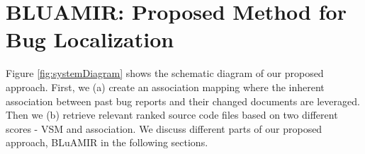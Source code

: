\documentclass[conference]{IEEEtran}
\begin{document}
\section{BLUAMIR: Proposed Method for Bug Localization} \label{sec:proposedmethod} 
Figure \ref{fig:systemDiagram} shows the schematic diagram of our proposed approach.
First, we (a) create an association mapping where the inherent association between past bug reports and their changed documents are leveraged.
Then we (b) retrieve relevant ranked source code files based on two different scores - VSM and association.  
We discuss different parts of our proposed approach, BLuAMIR in the following sections.
\end{document}
